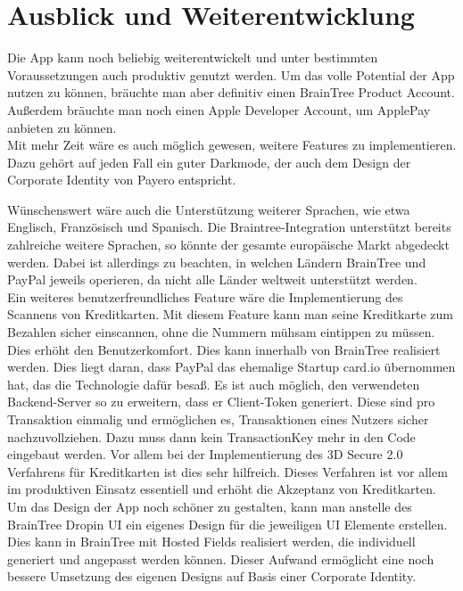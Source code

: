 
\chapter{Ausblick und Weiterentwicklung}

Die App kann noch beliebig weiterentwickelt und unter bestimmten Voraussetzungen auch produktiv genutzt werden.
Um das volle Potential der App nutzen zu können, bräuchte man aber definitiv einen BrainTree Product Account.
Außerdem bräuchte man noch einen Apple Developer Account, um ApplePay anbieten zu können.\\
Mit mehr Zeit wäre es auch möglich gewesen, weitere Features zu implementieren.
Dazu gehört auf jeden Fall ein guter Darkmode, der auch dem Design der Corporate Identity von \glqq Payero\grqq{} entspricht.

Wünschenswert wäre auch die Unterstützung weiterer Sprachen, wie etwa Englisch, Französisch und Spanisch.
Die Braintree-Integration unterstützt bereits zahlreiche weitere Sprachen, so könnte der gesamte europäische Markt abgedeckt werden. Dabei ist allerdings zu beachten, in welchen Ländern BrainTree und PayPal jeweils operieren, da nicht alle Länder weltweit unterstützt werden.
\\
Ein weiteres benutzerfreundliches Feature wäre die Implementierung des Scannens von Kreditkarten.
Mit diesem Feature kann man seine Kreditkarte zum Bezahlen sicher einscannen, ohne die Nummern mühsam eintippen zu müssen.
Dies erhöht den Benutzerkomfort.
Dies kann innerhalb von BrainTree realisiert werden.
Dies liegt daran, dass PayPal das ehemalige Startup card.io übernommen hat, das die Technologie dafür besaß.
Es ist auch möglich, den verwendeten Backend-Server so zu erweitern, dass er Client-Token generiert.
Diese sind pro Transaktion einmalig und ermöglichen es, Transaktionen eines Nutzers sicher nachzuvollziehen.
Dazu muss dann kein TransactionKey mehr in den Code eingebaut werden.
Vor allem bei der Implementierung des 3D Secure 2.0 Verfahrens für Kreditkarten ist dies sehr hilfreich.
Dieses Verfahren ist vor allem im produktiven Einsatz essentiell und erhöht die Akzeptanz von Kreditkarten.
Um das Design der App noch schöner zu gestalten, kann man anstelle des BrainTree Dropin UI ein eigenes Design für die jeweiligen UI Elemente erstellen.
Dies kann in BrainTree mit Hosted Fields realisiert werden, die individuell generiert und angepasst werden können.
Dieser Aufwand ermöglicht eine noch bessere Umsetzung des eigenen Designs auf Basis einer Corporate Identity.
